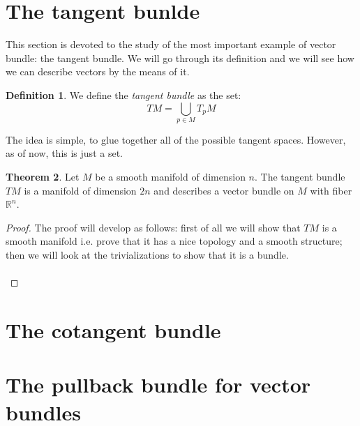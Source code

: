 \documentclass[12pt,a4paper]{report}
\theoremstyle{definition}
\newtheorem{Def}{Definition}[chapter]
\theoremstyle{Theorem}
\newtheorem{Theo}[Def]{Theorem}
\theoremstyle{definition}
\theoremstyle{definition}
\begin{document}
		\section{The tangent bunlde}
			This section is devoted to the study of the most important example of vector bundle: the tangent bundle. We will go through its definition and we will see how we can describe vectors by the means of it.
			\begin{Def}
				We define the\textit{ tangent bundle} as the set:
				$$TM=\bigcup_{p\in M}T_pM$$
			\end{Def}
			The idea is simple, to glue together all of the possible tangent spaces. However, as of now, this is just a set.
			\begin{Theo}
				Let $M$ be a smooth manifold of dimension $n$. The tangent bundle $TM$ is a manifold of dimension $2n$ and describes a vector bundle on $M$ with fiber $\mathbb{R}^n$. 
			\end{Theo}
			\begin{proof}
				The proof will develop as follows: first of all we will show that $TM$ is a smooth manifold i.e. prove that it has a nice topology and a smooth structure; then we will look at the trivializations to show that it is a bundle.\\
				\\
				
			\end{proof}
		\section{The cotangent bundle}
		\section{The pullback bundle for vector bundles}
\end{document}
